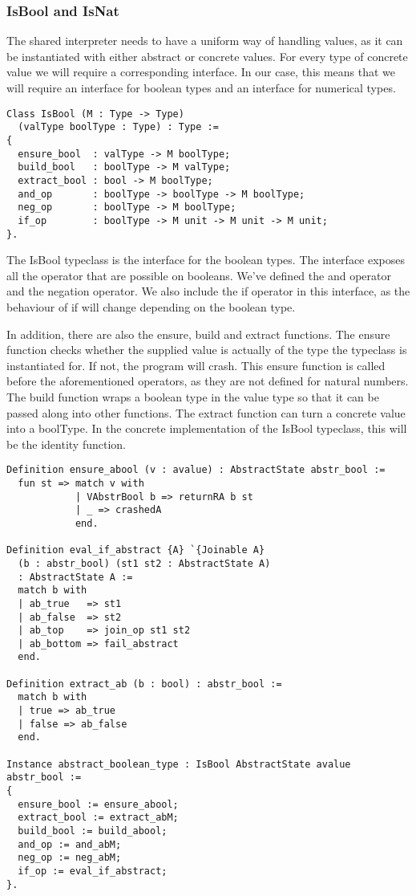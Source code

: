 \subsubsection{IsBool and IsNat}
The shared interpreter needs to have a uniform way of handling values, as it
can be instantiated with either abstract or concrete values. For every type of
concrete value we will require a corresponding interface. In our case, this
means that we will require an interface for boolean types and an interface for
numerical types.

\begin{verbatim}
Class IsBool (M : Type -> Type)
  (valType boolType : Type) : Type :=
{
  ensure_bool  : valType -> M boolType;
  build_bool   : boolType -> M valType;
  extract_bool : bool -> M boolType;
  and_op       : boolType -> boolType -> M boolType;
  neg_op       : boolType -> M boolType;
  if_op        : boolType -> M unit -> M unit -> M unit;
}.
\end{verbatim}

The IsBool typeclass is the interface for the boolean types. The interface
exposes all the operator that are possible on booleans. We've defined the and
operator and the negation operator. We also include the if operator in this
interface, as the behaviour of if will change depending on the boolean type. 

In addition, there are also the ensure, build and extract functions. The ensure
function checks whether the supplied value is actually of the type the
typeclass is instantiated for. If not, the program will crash. This ensure
function is called before the aforementioned operators, as they are not defined
for natural numbers. The build function wraps a boolean type in the value type
so that it can be passed along into other functions. The extract function can
turn a concrete value into a boolType. In the concrete implementation
of the IsBool typeclass, this will be the identity function.

\begin{verbatim}
Definition ensure_abool (v : avalue) : AbstractState abstr_bool :=
  fun st => match v with
            | VAbstrBool b => returnRA b st
            | _ => crashedA
            end.

Definition eval_if_abstract {A} `{Joinable A} 
  (b : abstr_bool) (st1 st2 : AbstractState A) 
  : AbstractState A :=
  match b with
  | ab_true   => st1
  | ab_false  => st2
  | ab_top    => join_op st1 st2
  | ab_bottom => fail_abstract
  end.

Definition extract_ab (b : bool) : abstr_bool := 
  match b with
  | true => ab_true
  | false => ab_false
  end.

Instance abstract_boolean_type : IsBool AbstractState avalue abstr_bool :=
{
  ensure_bool := ensure_abool;
  extract_bool := extract_abM;
  build_bool := build_abool;
  and_op := and_abM;
  neg_op := neg_abM;
  if_op := eval_if_abstract;
}.
\end{verbatim}


